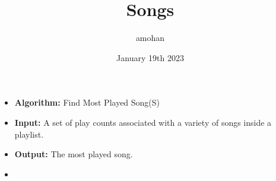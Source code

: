 \documentclass{article}
\title{Songs}
\author{amohan}
\date{January 19th 2023}
\begin{document}
\begin{itemize}
\item[]
\textbf{Algorithm:} Find Most Played Song(S)
\item[]
\textbf{Input:} A set of play counts associated with a variety of songs inside a playlist.
\item[]
\textbf{Output:} The most played song.
\item[]
\end{itemize}
\end{document}
